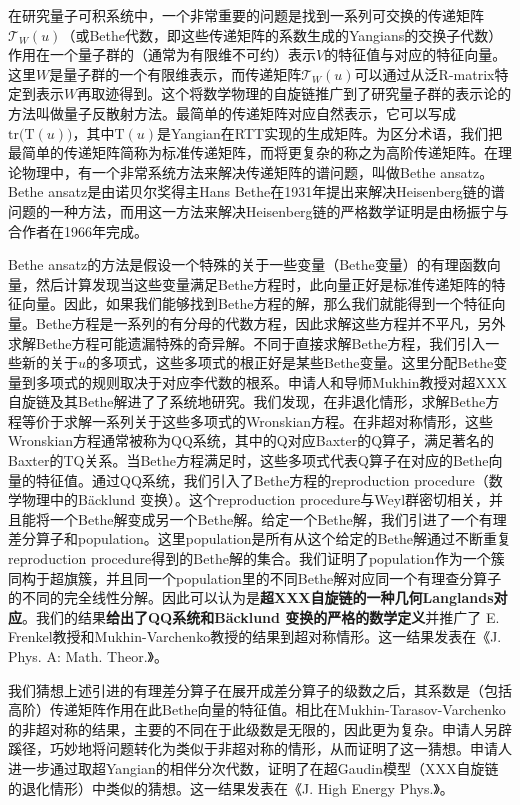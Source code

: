 \documentclass[12pt,UTF8,AutoFakeBold=4,a4paper]{ctexart}
\begin{document}
在研究量子可积系统中，一个非常重要的问题是找到一系列可交换的传递矩阵$\mathcal T_W(u)$（或Bethe代数，即这些传递矩阵的系数生成的Yangians的交换子代数）作用在一个量子群的（通常为有限维不可约）表示$V$的特征值与对应的特征向量。这里$W$是量子群的一个有限维表示，而传递矩阵$\mathcal T_W(u)$可以通过从泛R-matrix特定到表示$W$再取迹得到。这个将数学物理的自旋链推广到了研究量子群的表示论的方法叫做量子反散射方法。最简单的传递矩阵对应自然表示，它可以写成$\mathrm{tr}\big(\mathrm T(u)\big)$，其中$\mathrm T(u)$是Yangian在RTT实现的生成矩阵。为区分术语，我们把最简单的传递矩阵简称为标准传递矩阵，而将更复杂的称之为高阶传递矩阵。在理论物理中，有一个非常系统方法来解决传递矩阵的谱问题，叫做Bethe ansatz。Bethe ansatz是由诺贝尔奖得主Hans Bethe在1931年提出来解决Heisenberg链的谱问题的一种方法，而用这一方法来解决Heisenberg链的严格数学证明是由杨振宁与合作者在1966年完成。

Bethe ansatz的方法是假设一个特殊的关于一些变量（Bethe变量）的有理函数向量，然后计算发现当这些变量满足Bethe方程时，此向量正好是标准传递矩阵的特征向量。因此，如果我们能够找到Bethe方程的解，那么我们就能得到一个特征向量。Bethe方程是一系列的有分母的代数方程，因此求解这些方程并不平凡，另外求解Bethe方程可能遗漏特殊的奇异解。不同于直接求解Bethe方程，我们引入一些新的关于$u$的多项式，这些多项式的根正好是某些Bethe变量。这里分配Bethe变量到多项式的规则取决于对应李代数的根系。申请人和导师Mukhin教授对超XXX自旋链及其Bethe解进了了系统地研究。我们发现，在非退化情形，求解Bethe方程等价于求解一系列关于这些多项式的Wronskian方程。在非超对称情形，这些Wronskian方程通常被称为QQ系统，其中的Q对应Baxter的Q算子，满足著名的Baxter的TQ关系。当Bethe方程满足时，这些多项式代表Q算子在对应的Bethe向量的特征值。通过QQ系统，我们引入了Bethe方程的reproduction procedure（数学物理中的B\"{a}cklund 变换）。这个reproduction procedure与Weyl群密切相关，并且能将一个Bethe解变成另一个Bethe解。给定一个Bethe解，我们引进了一个有理差分算子和population。这里population是所有从这个给定的Bethe解通过不断重复reproduction procedure得到的Bethe解的集合。我们证明了population作为一个簇同构于超旗簇，并且同一个population里的不同Bethe解对应同一个有理查分算子的不同的完全线性分解。因此可以认为是\textbf{超XXX自旋链的一种几何Langlands对应}。我们的结果\textbf{给出了QQ系统和B\"{a}cklund 变换的严格的数学定义}并推广了 E. Frenkel教授和Mukhin-Varchenko教授的结果到超对称情形。这一结果发表在《J. Phys. A: Math. Theor.》。

我们猜想上述引进的有理差分算子在展开成差分算子的级数之后，其系数是（包括高阶）传递矩阵作用在此Bethe向量的特征值。相比在Mukhin-Tarasov-Varchenko的非超对称的结果，主要的不同在于此级数是无限的，因此更为复杂。申请人另辟蹊径，巧妙地将问题转化为类似于非超对称的情形，从而证明了这一猜想。申请人进一步通过取超Yangian的相伴分次代数，证明了在超Gaudin模型（XXX自旋链的退化情形）中类似的猜想。这一结果发表在《J. High Energy Phys.》。
\end{document}
